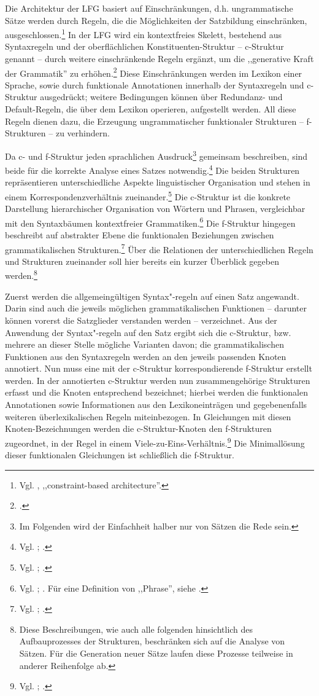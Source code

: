 \documentclass[12pt,a4paper]{article}
\begin{document}
Die Architektur der LFG basiert auf Einschränkungen, d.h. ungrammatische Sätze werden durch Regeln, die die Möglichkeiten der Satzbildung einschränken, ausgeschlossen.\footnote{Vgl. \cite[S. vii (preface)]{Bresnan}, ,,constraint-based architecture''.}
In der LFG wird ein kontextfreies Skelett, bestehend aus Syntaxregeln und der oberflächlichen Konstituenten-Struktur -- c-Struktur genannt -- durch weitere einschränkende Regeln ergänzt, um die ,,generative Kraft der Grammatik'' zu erhöhen.\footnote{\cite[9]{Rohrer}.} Diese Einschränkungen werden im Lexikon einer Sprache, sowie durch funktionale Annotationen innerhalb der Syntaxregeln und c-Struktur ausgedrückt; weitere Bedingungen können über Redundanz- und Default-Regeln, die über dem Lexikon operieren, aufgestellt werden. All diese Regeln dienen dazu, die Erzeugung ungrammatischer funktionaler Strukturen -- f-Strukturen -- zu verhindern.

Da c- und f-Struktur jeden sprachlichen Ausdruck\footnote{Im Folgenden wird der Einfachheit halber nur von Sätzen die Rede sein.} gemeinsam beschreiben, sind beide für die korrekte Analyse eines Satzes notwendig.\footnote{Vgl. \cite[3]{Dal}; \cite[4; 8]{Skript}.} Die beiden Strukturen repräsentieren unterschiedliche Aspekte linguistischer Organisation und stehen in einem Korrespondenzverhältnis zueinander.\footnote{Vgl. \cite[1]{Dal}; \cite[26-7; 35]{Rohrer}.} Die c-Struktur ist die konkrete Darstellung hierarchischer Organisation von Wörtern und Phrasen, vergleichbar mit den Syntaxbäumen kontextfreier Grammatiken.\footnote{Vgl. \cite[7]{Dal}; \cite[13]{Rohrer}. Für eine Definition von ,,Phrase'', siehe \cite[5]{Bresnan}.} Die f-Struktur hingegen beschreibt auf abstrakter Ebene die funktionalen Beziehungen zwischen grammatikalischen Strukturen.\footnote{Vgl. \cite[7]{Dal}; \cite[4]{Skript}.} Über die Relationen der unterschiedlichen Regeln und Strukturen zueinander soll hier bereits ein kurzer Überblick gegeben werden.\footnote{Diese Beschreibungen, wie auch alle folgenden hinsichtlich des Aufbauprozesses der Strukturen, beschränken sich auf die Analyse von Sätzen. Für die Generation neuer Sätze laufen diese Prozesse teilweise in anderer Reihenfolge ab.}

Zuerst werden die allgemeingültigen Syntax"-regeln auf einen Satz angewandt. Darin sind auch die jeweils möglichen grammatikalischen Funktionen -- darunter können vorerst die Satzglieder verstanden werden -- verzeichnet. Aus der Anwendung der Syntax"-regeln auf den Satz ergibt sich die c-Struktur, bzw. mehrere an dieser Stelle mögliche Varianten davon; die grammatikalischen Funktionen aus den Syntaxregeln werden an den jeweils passenden Knoten annotiert. Nun muss eine mit der c-Struktur korrespondierende f-Struktur erstellt werden. In der annotierten c-Struktur werden nun zusammengehörige Strukturen erfasst und die Knoten entsprechend bezeichnet; hierbei werden die funktionalen Annotationen sowie Informationen aus den Lexikoneinträgen und gegebenenfalls weiteren überlexikalischen Regeln miteinbezogen. In Gleichungen mit diesen Knoten-Bezeichnungen werden die c-Struktur-Knoten den f-Strukturen zugeordnet, in der Regel in einem Viele-zu-Eins-Verhältnis.\footnote{Vgl. \cite[64]{Falk}; \cite[9]{Skript}.} Die Minimallösung dieser funktionalen Gleichungen ist schließlich die f-Struktur.
\end{document}
